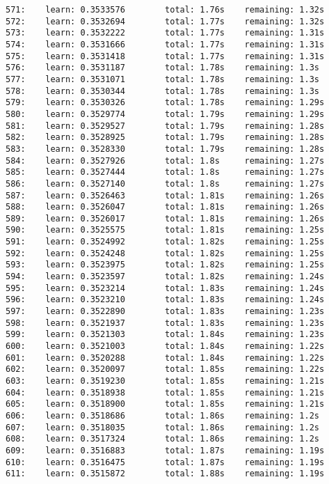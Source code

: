 \documentclass[11pt]{article}
\begin{document}
\begin{Verbatim}[commandchars=\\\{\}]
571:    learn: 0.3533576        total: 1.76s    remaining: 1.32s
572:    learn: 0.3532694        total: 1.77s    remaining: 1.32s
573:    learn: 0.3532222        total: 1.77s    remaining: 1.31s
574:    learn: 0.3531666        total: 1.77s    remaining: 1.31s
575:    learn: 0.3531418        total: 1.77s    remaining: 1.31s
576:    learn: 0.3531187        total: 1.78s    remaining: 1.3s
577:    learn: 0.3531071        total: 1.78s    remaining: 1.3s
578:    learn: 0.3530344        total: 1.78s    remaining: 1.3s
579:    learn: 0.3530326        total: 1.78s    remaining: 1.29s
580:    learn: 0.3529774        total: 1.79s    remaining: 1.29s
581:    learn: 0.3529527        total: 1.79s    remaining: 1.28s
582:    learn: 0.3528925        total: 1.79s    remaining: 1.28s
583:    learn: 0.3528330        total: 1.79s    remaining: 1.28s
584:    learn: 0.3527926        total: 1.8s     remaining: 1.27s
585:    learn: 0.3527444        total: 1.8s     remaining: 1.27s
586:    learn: 0.3527140        total: 1.8s     remaining: 1.27s
587:    learn: 0.3526463        total: 1.81s    remaining: 1.26s
588:    learn: 0.3526047        total: 1.81s    remaining: 1.26s
589:    learn: 0.3526017        total: 1.81s    remaining: 1.26s
590:    learn: 0.3525575        total: 1.81s    remaining: 1.25s
591:    learn: 0.3524992        total: 1.82s    remaining: 1.25s
592:    learn: 0.3524248        total: 1.82s    remaining: 1.25s
593:    learn: 0.3523975        total: 1.82s    remaining: 1.25s
594:    learn: 0.3523597        total: 1.82s    remaining: 1.24s
595:    learn: 0.3523214        total: 1.83s    remaining: 1.24s
596:    learn: 0.3523210        total: 1.83s    remaining: 1.24s
597:    learn: 0.3522890        total: 1.83s    remaining: 1.23s
598:    learn: 0.3521937        total: 1.83s    remaining: 1.23s
599:    learn: 0.3521303        total: 1.84s    remaining: 1.23s
600:    learn: 0.3521003        total: 1.84s    remaining: 1.22s
601:    learn: 0.3520288        total: 1.84s    remaining: 1.22s
602:    learn: 0.3520097        total: 1.85s    remaining: 1.22s
603:    learn: 0.3519230        total: 1.85s    remaining: 1.21s
604:    learn: 0.3518938        total: 1.85s    remaining: 1.21s
605:    learn: 0.3518900        total: 1.85s    remaining: 1.21s
606:    learn: 0.3518686        total: 1.86s    remaining: 1.2s
607:    learn: 0.3518035        total: 1.86s    remaining: 1.2s
608:    learn: 0.3517324        total: 1.86s    remaining: 1.2s
609:    learn: 0.3516883        total: 1.87s    remaining: 1.19s
610:    learn: 0.3516475        total: 1.87s    remaining: 1.19s
611:    learn: 0.3515872        total: 1.88s    remaining: 1.19s

\end{Verbatim}
\end{document}
